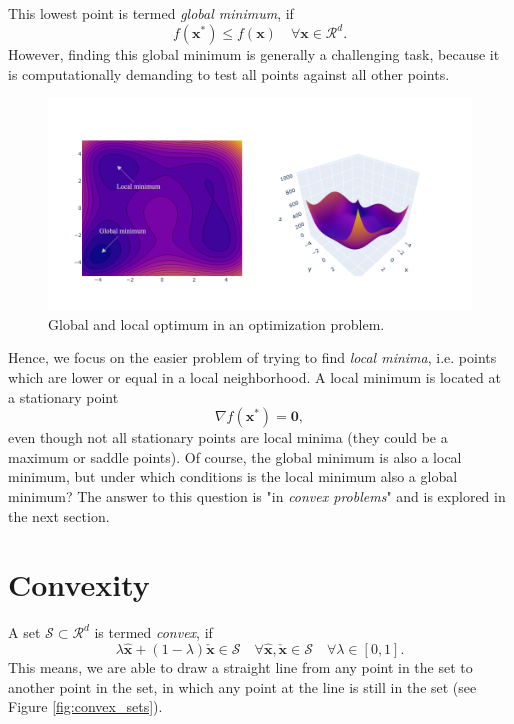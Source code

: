 This lowest point is termed \emph{global minimum}, if 
\begin{equation}
    f(\mathbf{x}^*) \le f(\mathbf{x})  \quad \forall \mathbf{x} \in \mathcal{R}^d.
\end{equation}
However, finding this global minimum is generally a challenging task, because it is computationally demanding to test all points against all other points. 

\begin{figure}
    \centering
    \includegraphics[width=\textwidth]{figures/opti_landscape.png}
    \caption{Global and local optimum in an optimization problem.}
    \label{fig:global_local_optimization}
\end{figure}

Hence, we focus on the easier problem of trying to find \emph{local minima}, i.e. points which are lower or equal in a local neighborhood. A local minimum is located at a stationary point 
\begin{equation}
    \nabla f(\mathbf{x}^*) = \mathbf{0},
    \label{eq:stationary_point}
\end{equation}
even though not all stationary points are local minima (they could be a maximum or saddle points).
Of course, the global minimum is also a local minimum, but under which conditions is the local minimum also a global minimum? The answer to this question is "in \emph{convex problems}" and is explored in the next section.

\section{Convexity}
A set $\mathcal{S} \subset \mathcal{R}^d$ is termed \emph{convex}, if 
\begin{equation}
    \lambda \hat{\mathbf{x}} + (1-\lambda) \check{\mathbf{x}} \in \mathcal{S} \quad \forall \hat{\mathbf{x}}, \check{\mathbf{x}} \in \mathcal{S} \quad  \forall \lambda \in [0,1].
\end{equation}
This means, we are able to draw a straight line from any point in the set to another point in the set, in which any point at the line is still in the set (see Figure \ref{fig:convex_sets}).

